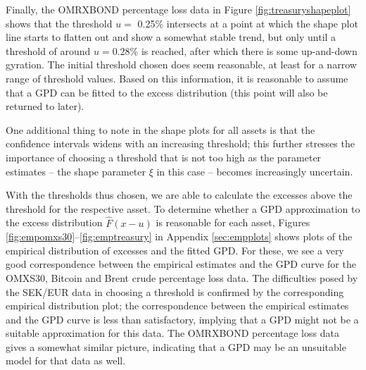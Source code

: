 \documentclass[a4paper,11pt]{article}
\theoremstyle{definition}
\theoremstyle{definition}
\theoremstyle{definition}
\theoremstyle{definition}
\theoremstyle{remark}
\begin{document}
Finally, the OMRXBOND percentage loss data in Figure \ref{fig:treasuryshapeplot} shows that the threshold \(u =\) 0.25\% intersects at a point at which the shape plot line starts to flatten out and show a somewhat stable trend, but only until a threshold of around \(u = 0.28\)\% is reached, after which there is some up-and-down gyration. The initial threshold chosen does seem reasonable, at least for a narrow range of threshold values. Based on this information, it is reasonable to assume that a GPD can be fitted to the excess distribution (this point will also be returned to later).

One additional thing to note in the shape plots for all assets is that the confidence intervals widens with an increasing threshold; this further stresses the importance of choosing a threshold that is not too high as the parameter estimates -- the shape parameter \(\xi\) in this case -- becomes increasingly uncertain.

With the thresholds thus chosen, we are able to calculate the excesses above the threshold for the respective asset. To determine whether a GPD approximation to the excess distribution \(\hat F(x-u)\) is reasonable for each asset, Figures \ref{fig:empomxs30}--\ref{fig:emptreasury} in Appendix \ref{sec:empplots} shows plots of the empirical distribution of excesses and the fitted GPD. For these, we see a very good correspondence between the empirical estimates and the GPD curve for the OMXS30, Bitcoin and Brent crude percentage loss data. The difficulties posed by the SEK/EUR data in choosing a threshold is confirmed by the corresponding empirical distribution plot; the correspondence between the empirical estimates and the GPD curve is less than satisfactory, implying that a GPD might not be a suitable approximation for this data. The OMRXBOND percentage loss data gives a somewhat similar picture, indicating that a GPD may be an unsuitable model for that data as well.
\end{document}
